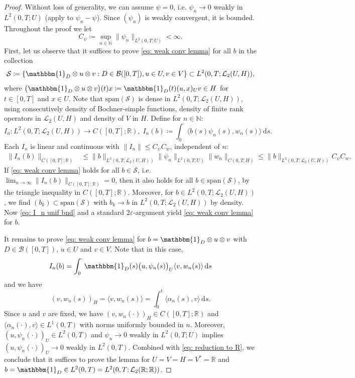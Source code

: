 \documentclass{amsart}
\newcommand{\dd}{\,\mathrm{d}}
\newcommand{\UH}{\mathcal{L}_2(U,H)}
\newcommand{\one}{\mathbbm{1}}
\newcommand{\<}{\langle}
\newcommand{\?}{\rangle}
\theoremstyle{plain}
\theoremstyle{remark}
\theoremstyle{plain}
\numberwithin{equation}{section}
\def\N{{\mathbb N}}
\def\R{{\mathbb R}}
\newcommand{\BB}{\mathcal{B}}
\newcommand{\eps}{\varepsilon}
\begin{document}
\begin{proof}
Without loss of generality, we can assume $\psi=0$, i.e. $\psi_n\to 0$ weakly in $L^2(0,T;U)$ (apply to $\psi_n-\psi$).
Since $(\psi_n)$ is weakly convergent, it is bounded. Throughout the proof we let
\[
C_\psi\coloneqq  \sup_{n\in\N}\|\psi_n\|_{L^2(0,T;U)}<\infty.
\]
First, let us observe that it suffices to prove \eqref{eq: weak conv lemma} for all $b$ in the collection \[
\mathcal{S}\coloneqq\{\one_D\otimes u\otimes v: D\in \BB([0,T]), u\in U, v\in V\}\subset L^2(0,T;\UH),
\]
where $\big(\one_D\otimes u\otimes v\big)(t)x\coloneqq\one_D(t)(u,x)_Uv\in H$ for $t\in [0,T]$ and  $x\in U$. Note that $\mathrm{span}(\mathcal{S})$ is dense in $L^2(0,T;\UH)$, using consecutively density of Bochner-simple functions, density of finite rank operators in $\mathcal{L}_2(U,H)$ and density of $V$ in $H$.
Define for $n\in\N$:
\[
I_n\colon L^2(0,T;\UH)\to C([0,T];\R), \; I_n(b) \coloneqq \int_0^\cdot \<{b}(s)\psi_n(s),w_n(s)\?\dd s.
\]
Each $I_n$ is linear and continuous with $\|I_n\|\leq C_\psi C_w$, independent of $n$:
\begin{align}\label{eq: I_n unif bnd}
\|I_n(b)\|_{C([0,T];\R)}&\leq  \|b\|_{L^2(0,T;\UH)}\|\psi_n\|_{L^2(0,T;U)}\|w_n\|_{C(0,T;H)}\leq \|b\|_{L^2(0,T;\UH)}C_\psi C_w.
\end{align}
If \eqref{eq: weak conv lemma} holds for all $b\in \mathcal{S}$, i.e. \!\! $\lim_{n\to\infty}\|I_n(b)\|_{C([0,T];\R)}=0$, then it also holds for all $b\in \mathrm{span}(\mathcal{S})$, by the triangle inequality in $C([0,T];\R)$. Moreover, for $b\in L^2(0,T;\UH)$, we find $(b_k)\subset \mathrm{span}(\mathcal{S})$ with $b_k \to b$ in $L^2(0,T;\UH)$ by density. Now \eqref{eq: I_n unif bnd} and a standard $2\eps$-argument
yield \eqref{eq: weak conv lemma} for $b$.

It remains to prove \eqref{eq: weak conv lemma} for $b=\one_D\otimes u\otimes v$ with $D\in \BB([0,T])$, $u\in U$ and $v\in V$. Note that in this case,
\begin{equation}\label{eq: reduction to R}
I_n(b)=\int_0^\cdot \one_D(s)\big(u,\psi_n(s)\big)_U\<v,w_n(s)\?\dd s
\end{equation}
and we have
\[
(v, w_n(s))_H=\<v,w_n(s)\?=\int_0^t \<\alpha_n(s),v\?\dd s.
\]
Since $u$ and $v$ are fixed, we have $(v, w_n(\cdot))_H\in C([0,T];\R)$ and $\<\alpha_n(\cdot),v\?\in L^1(0,T)$ with norms uniformly bounded in $n$. Moreover, $(u,\psi_n(\cdot))_U\in L^2(0,T)$ and $\psi_n\to 0$ weakly in $L^2(0,T;U)$ implies $(u,\psi_n(\cdot))_U\to 0$ weakly in $L^2(0,T)$.
Combined with \eqref{eq: reduction to R}, we conclude that it suffices to prove the lemma for $U=V=H=V^*=\R$ and $b=\one_D\in L^2(0,T)=L^2(0,T;\mathcal{L}_2(\R;\R))$.


\end{proof}
\end{document}
